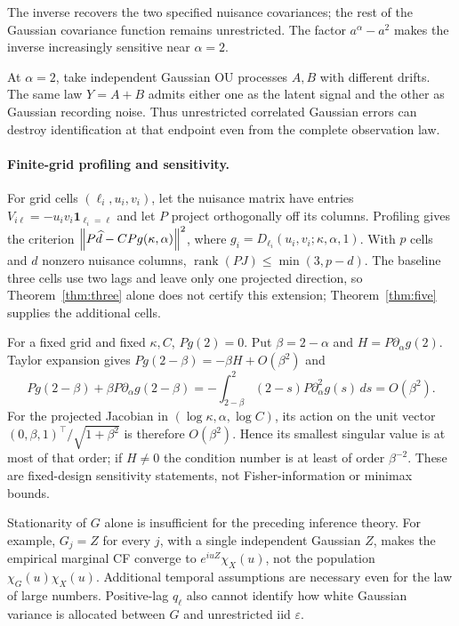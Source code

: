 \documentclass[11pt,a4paper]{article}
\theoremstyle{remark}\newtheorem{remark}[theorem]{Remark}
\begin{document}
The inverse recovers the two specified nuisance covariances; the rest of the Gaussian covariance function remains unrestricted. The factor $a^\alpha-a^2$ makes the inverse increasingly sensitive near $\alpha=2$.


At $\alpha=2$, take independent Gaussian OU processes $A,B$ with different drifts. The same law $Y=A+B$ admits either one as the latent signal and the other as Gaussian recording noise. Thus unrestricted correlated Gaussian errors can destroy identification at that endpoint even from the complete observation law.

\paragraph{Finite-grid profiling and sensitivity.}
For grid cells $(\ell_i,u_i,v_i)$, let the nuisance matrix have entries $V_{i\ell}=-u_iv_i\mathbf1_{\ell_i=\ell}$ and let $P$ project orthogonally off its columns. Profiling gives the criterion $\left\lVert P\widehat d-CPg(\kappa,\alpha)\right\rVert^2$, where $g_i=D_{\ell_i}(u_i,v_i;\kappa,\alpha,1)$. With $p$ cells and $d$ nonzero nuisance columns, $\operatorname{rank}(PJ)\le\min(3,p-d)$. The baseline three cells use two lags and leave only one projected direction, so Theorem~\ref{thm:three} alone does not certify this extension; Theorem~\ref{thm:five} supplies the additional cells.

For a fixed grid and fixed $\kappa,C$, $Pg(2)=0$. Put $\beta=2-\alpha$ and $H=P\partial_\alpha g(2)$. Taylor expansion gives $Pg(2-\beta)=-\beta H+O(\beta^2)$ and
\[
Pg(2-\beta)+\beta P\partial_\alpha g(2-\beta)
=-\int_{2-\beta}^2(2-s)P\partial_\alpha^2g(s)\,ds=O(\beta^2).
\]
For the projected Jacobian in $(\log\kappa,\alpha,\log C)$, its action on the unit vector $(0,\beta,1)^\top/\sqrt{1+\beta^2}$ is therefore $O(\beta^2)$. Hence its smallest singular value is at most of that order; if $H\ne0$ the condition number is at least of order $\beta^{-2}$. These are fixed-design sensitivity statements, not Fisher-information or minimax bounds.

Stationarity of $G$ alone is insufficient for the preceding inference theory. For example, $G_j=Z$ for every $j$, with a single independent Gaussian $Z$, makes the empirical marginal CF converge to $e^{iuZ}\chi_X(u)$, not the population $\chi_G(u)\chi_X(u)$. Additional temporal assumptions are necessary even for the law of large numbers. Positive-lag $q_\ell$ also cannot identify how white Gaussian variance is allocated between $G$ and unrestricted iid $\varepsilon$.
\end{document}
